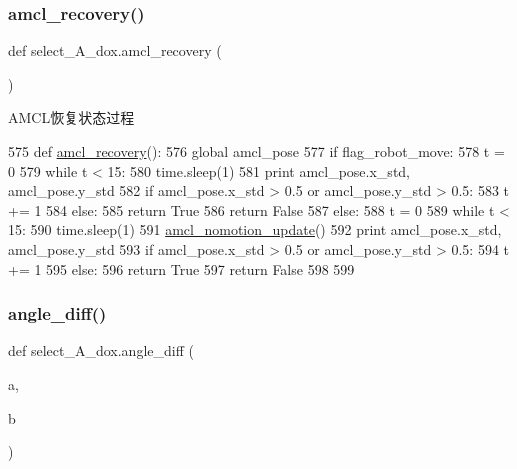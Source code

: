 \subsubsection{\texorpdfstring{amcl\+\_\+recovery()}{amcl\_recovery()}}
{\footnotesize\ttfamily def select\+\_\+\+A\+\_\+dox.\+amcl\+\_\+recovery (\begin{DoxyParamCaption}{ }\end{DoxyParamCaption})}



A\+M\+C\+L恢复状态过程 


\begin{DoxyCode}
575 \textcolor{keyword}{def }\hyperlink{namespaceselect___a__dox_a37dfe6ff00e8834a1d53c1612354758c}{amcl\_recovery}():
576     \textcolor{keyword}{global} amcl\_pose
577     \textcolor{keywordflow}{if} flag\_robot\_move:
578         t = 0
579         \textcolor{keywordflow}{while} t < 15:
580             time.sleep(1)
581             \textcolor{keywordflow}{print} amcl\_pose.x\_std, amcl\_pose.y\_std
582             \textcolor{keywordflow}{if} amcl\_pose.x\_std > 0.5 \textcolor{keywordflow}{or} amcl\_pose.y\_std > 0.5:
583                 t += 1
584             \textcolor{keywordflow}{else}:
585                 \textcolor{keywordflow}{return} \textcolor{keyword}{True}
586         \textcolor{keywordflow}{return} \textcolor{keyword}{False}
587     \textcolor{keywordflow}{else}:
588         t = 0
589         \textcolor{keywordflow}{while} t < 15:
590             time.sleep(1)
591             \hyperlink{namespaceselect___a__dox_a1c4df087055bbe2cb5ce63c92a51d493}{amcl\_nomotion\_update}()
592             \textcolor{keywordflow}{print} amcl\_pose.x\_std, amcl\_pose.y\_std
593             \textcolor{keywordflow}{if} amcl\_pose.x\_std > 0.5 \textcolor{keywordflow}{or} amcl\_pose.y\_std > 0.5:
594                 t += 1
595             \textcolor{keywordflow}{else}:
596                 \textcolor{keywordflow}{return} \textcolor{keyword}{True}
597         \textcolor{keywordflow}{return} \textcolor{keyword}{False}
598 
599 
\end{DoxyCode}
\mbox{\label{namespaceselect___a__dox_a2e96d33700cc43f6769c8717a1538684}} 
\subsubsection{\texorpdfstring{angle\+\_\+diff()}{angle\_diff()}}
{\footnotesize\ttfamily def select\+\_\+\+A\+\_\+dox.\+angle\+\_\+diff (\begin{DoxyParamCaption}\item[{}]{a,  }\item[{}]{b }\end{DoxyParamCaption})}



